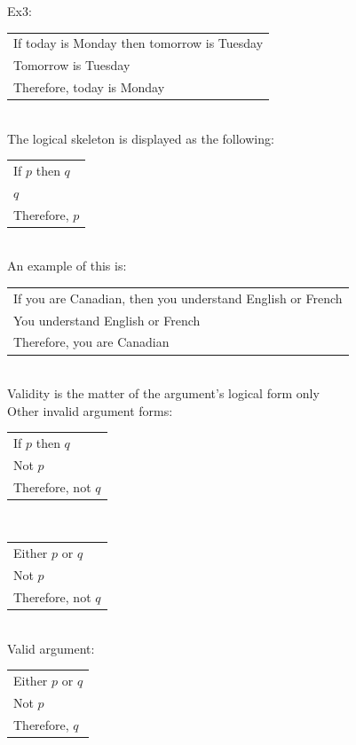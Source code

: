 \documentclass[11pt, fleqn]{article}
\begin{document}
Ex3:\\
\begin{tabular}{p{8cm}}
    If today is Monday then tomorrow is Tuesday\\
    Tomorrow is Tuesday\\
    \hline
    Therefore, today is Monday
\end{tabular}\\
The logical skeleton is displayed as the following:\\
\begin{tabular}{p{3cm}}
    If $p$ then $q$\\
    $q$\\
    \hline
    Therefore, $p$
\end{tabular}\\
An example of this is:\\
\begin{tabular}{p{10cm}}
    If you are Canadian, then you understand English or French\\
    You understand English or French\\
    \hline
    Therefore, you are Canadian
\end{tabular}\\

Validity is the matter of the argument's logical form only\\

Other invalid argument forms:\\
\begin{tabular}{p{3cm}}
    If $p$ then $q$\\
    Not $p$\\
    \hline
    Therefore, not $q$
\end{tabular}\\

\begin{tabular}{p{3cm}}
    Either $p$ or $q$\\
    Not $p$\\
    \hline
    Therefore, not $q$
\end{tabular}\\

Valid argument:\\
\begin{tabular}{p{3cm}}
    Either $p$ or $q$\\
    Not $p$\\
    \hline
    Therefore, $q$
\end{tabular}\\
\end{document}
